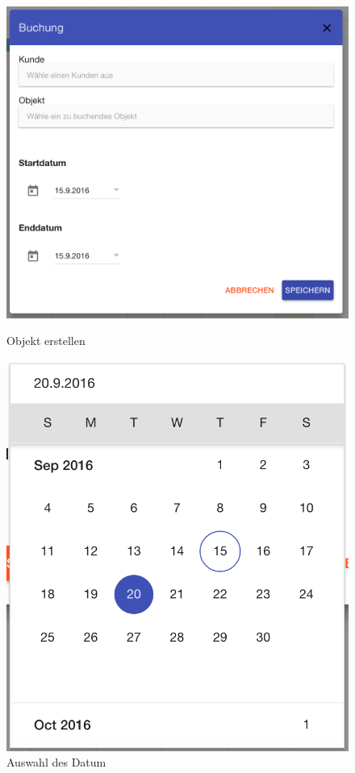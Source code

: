 \begin{figure}[H]
    \centering
    \begin{minipage}[t]{0.49\linewidth}
        \centering
        \includegraphics[width=\linewidth]{images/frontend_booking_new.png}
        \caption{Objekt erstellen}
        \label{frontend_booking_new}
    \end{minipage}%
    \hfill
    \begin{minipage}[t]{0.49\linewidth}
        \centering
        \includegraphics[width=\linewidth]{images/frontend_booking_calender.png}
        \caption{Auswahl des Datum}        
        \label{frontend_booking_calender}
    \end{minipage}
\end{figure}


